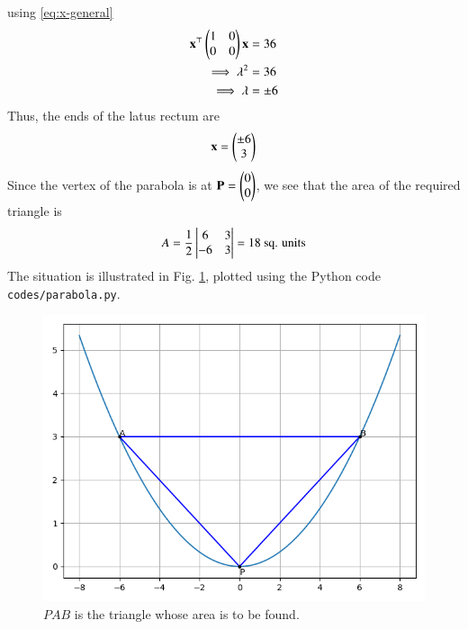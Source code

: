 \documentclass[journal,12pt,twocolumn]{IEEEtran}
\renewcommand{\vec}[1]{\boldsymbol{\mathbf{#1}}}
\begin{document}
\begin{enumerate}
    using \eqref{eq:x-general}
    \begin{align}
        \vec{x}^\top\myvec{1&0\\0&0}\vec{x} &= 36 \\
        \implies \lambda^2 &= 36 \\
        \implies \lambda &= \pm 6
        \label{eq:x-latus}
    \end{align}
    Thus, the ends of the latus rectum are
    \begin{align}
        \vec{x} = \myvec{\pm 6\\3}
    \end{align}
    Since the vertex of the parabola is at $\vec{P} = \myvec{0\\0}$,
    we see that the area of the required triangle is
    \begin{align}
        A = \frac{1}{2}\begin{vmatrix}6&3\\-6&3\end{vmatrix} = 18\ \textrm{sq. units}
    \end{align}
    The situation is illustrated in Fig. \ref{fig:parabola}, plotted using the
    Python code \texttt{codes/parabola.py}.
    \begin{figure}[!ht]
        \centering
        \includegraphics[width=\columnwidth]{figs/parabola.png}
        \caption{$PAB$ is the triangle whose area is to be found.}
        \label{fig:parabola}
    \end{figure}
\end{enumerate}
\end{document}
